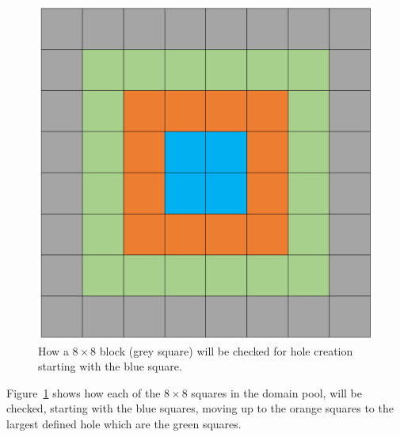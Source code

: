 \documentclass[10pt,twocolumn, a4paper]{witseiepaper}
\begin{document}
\begin{figure}[h!]
\renewcommand{\thefigure}{\arabic{figure}}
\centering
\includegraphics[scale=0.2]{Grid.png}
\caption{How a $8\times 8$ block (grey square) will be checked for hole creation starting with the blue square.}
\label{fig: Grid}
\end{figure}

Figure~\ref{fig: Grid} shows how each of the $8\times 8$ squares in the domain pool, will be checked, starting with the blue squares, moving up to the orange squares to the largest defined hole which are the green squares.
\end{document}
